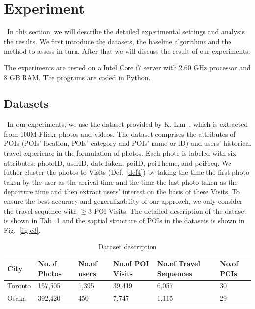 \documentclass[runningheads]{llncs}
\begin{document}
\section{Experiment}
\quad\, In this section, we will describe the detailed experimental settings and analysis the results. We first introduce the datasets, the baseline algorithms and the method to assess in turn. After that we will discuss the result of our experiments. 

The experiments are tested on a Intel Core i7 server with 2.60 GHz processor and 8 GB RAM. The programs are coded in Python. 
\subsection{Datasets}
\quad\, In our experiments, we use the dataset provided by K. Lim~\cite{lim2015personalized}, which is extracted from 100M Flickr photos and videos. The dataset comprises the attributes of POIs (POIs' location, POIs' category and POIs' name or ID) and users' historical travel experience in the formulation of photos. Each photo is labeled with six attributes: photoID, userID, dateTaken, poiID, poiTheme, and poiFreq. We futher cluster the photos to Visits (Def.~\ref{def4}) by taking the time the first photo taken by the user as the arrival time and the time the last photo taken as the departure time and then extract users' interest on the basis of these Visits. To ensure the best accuracy and generalizability of our approach, we only consider the travel sequence with $\geq3$ POI Visits. The detailed description of the dataset is shown in Tab.~\ref{tab1} and the saptial structure of POIs in the datasets is shown in Fig.~\ref{fig:e3}.
\begin{table}
	\caption{Dataset description}\label{tab1}
	\begin{tabular}{|l|l|l|l|l|l|}
		\hline
		City & No.of Photos & No.of users & No.of POI Visits & No.of Travel Sequences & No.of POIs\\
		\hline
		Toronto & 157,505 & 1,395 & 39,419 & 6,057 & 30\\
		\hline
		Osaka & 392,420 & 450 & 7,747 & 1,115 & 29\\
		\hline
	\end{tabular}
\end{table}
\end{document}
